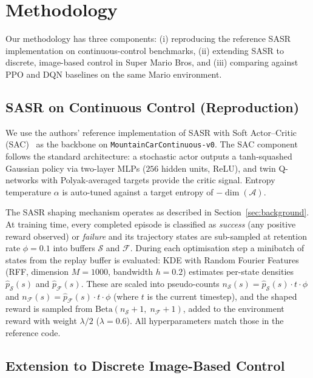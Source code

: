 \documentclass{article}
\begin{document}
\section{Methodology}
\label{sec:methodology}

Our methodology has three components: (i) reproducing the reference SASR implementation on continuous-control benchmarks, (ii) extending SASR to discrete, image-based control in Super Mario Bros, and (iii) comparing against PPO and DQN baselines on the same Mario environment.

\subsection{SASR on Continuous Control (Reproduction)}

We use the authors' reference implementation of SASR with Soft Actor--Critic (SAC)~\citep{haarnoja2018sac} as the backbone on \texttt{MountainCarContinuous-v0}. The SAC component follows the standard architecture: a stochastic actor outputs a tanh-squashed Gaussian policy via two-layer MLPs ($256$ hidden units, ReLU), and twin Q-networks with Polyak-averaged targets provide the critic signal. Entropy temperature $\alpha$ is auto-tuned against a target entropy of $-\dim(\mathcal{A})$.

The SASR shaping mechanism operates as described in Section~\ref{sec:background}. At training time, every completed episode is classified as \emph{success} (any positive reward observed) or \emph{failure} and its trajectory states are sub-sampled at retention rate $\phi = 0.1$ into buffers $\mathcal{S}$ and $\mathcal{F}$. During each optimisation step a minibatch of states from the replay buffer is evaluated: KDE with Random Fourier Features (RFF, dimension $M = 1000$, bandwidth $h = 0.2$) estimates per-state densities $\hat{p}_\mathcal{S}(s)$ and $\hat{p}_\mathcal{F}(s)$. These are scaled into pseudo-counts $n_\mathcal{S}(s) = \hat{p}_\mathcal{S}(s) \cdot t \cdot \phi$ and $n_\mathcal{F}(s) = \hat{p}_\mathcal{F}(s) \cdot t \cdot \phi$ (where $t$ is the current timestep), and the shaped reward is sampled from $\mathrm{Beta}(n_\mathcal{S} + 1,\; n_\mathcal{F} + 1)$, added to the environment reward with weight $\lambda / 2$ ($\lambda = 0.6$). All hyperparameters match those in the reference code.

\subsection{Extension to Discrete Image-Based Control}
\end{document}
